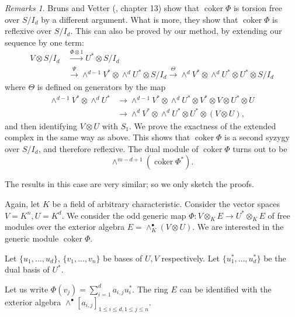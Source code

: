 \documentclass{tran-l}
\theoremstyle{plain}
\theoremstyle{remark}
\newtheorem*{remark1}{Remarks}
\theoremstyle{definition}
\newcommand{\coker}{\operatorname{coker}}
\begin{document}
\begin{remark1}
Bruns and Vetter (\cite{BV}, chapter 13) show that $\coker \Phi $ is
torsion free over $S/I_{d}$ by a different argument. 
What is more, they show that $\coker \Phi $ is
reflexive over $S/I_{d}$. 
This can also be proved by our method, by extending
our sequence by one term:
\begin{align*}
V\otimes S/I_{d} \,&{\overset{{\Phi \otimes 1}}{\longrightarrow }} U^{*}\otimes
S/I_{d} \\
&{\overset{\Psi }{\longrightarrow }}\wedge ^{d-1}V^{*}\otimes \wedge
^{d} U^{*}\otimes S/I_{d} {\overset{\Theta }{\longrightarrow }} 
\wedge ^{d}V^{*}\otimes \wedge ^{d} U^{*}\otimes U^{*}\otimes S/I_{d}
\end{align*}
where $\Theta $ is defined on generators by the map 
\begin{align*}
\wedge ^{d-1}V^{*}\otimes \wedge ^{d} U^{*}&\rightarrow \wedge 
^{d-1}V^{*}\otimes \wedge ^{d} U^{*}\otimes V^{*}\otimes V\otimes 
U^{*}\otimes U\\
&\rightarrow \wedge ^{d} V^{*}\otimes \wedge ^{d} U^{*}\otimes U^{*}\otimes
(V\otimes U) ,
\end{align*}
and then identifying $V\otimes U$ with $S_{1}$. We prove the exactness
of the extended complex in the same way as above.  This shows 
that $\coker \Phi $ is a second syzygy over $S/I_{d}$, and therefore reflexive. 
The dual module of $\coker \Phi $ turns out to be 
\[\wedge ^{m-d+1}(\coker \Phi ^{*}).\]
\end{remark1}


The results in this case are very similar; so we only sketch the proofs.

Again, let $K$ be a field  of arbitrary
characteristic. Consider the vector spaces $V=K^{n}, U=K^{d}$. We
consider the odd generic map $\Phi :V\otimes _{K} E\rightarrow U^{*}\otimes _{K} E$  of free modules over the exterior algebra $E =
\wedge ^{\bullet }_{K} (V\otimes U)$. We are interested in the generic
module $\coker \Phi $.

Let $\lbrace u_{1} ,\ldots ,u_{d}\rbrace $, $\lbrace v_{1} ,\ldots
,v_{n}\rbrace $ be bases of $U, V$ respectively. Let $\lbrace u_{1}^{*} ,\ldots
,u_{d}^{*} \rbrace $ be the dual basis of $U^{*}$.

Let us write $\Phi (v_{j} )=\sum _{i=1}^{d} a_{i,j}u_{i}^{*}$. The ring $E$
can be identified with the exterior algebra
$\wedge ^{\bullet }[a_{i,j}]_{1\le i\le d,1\le j\le n}$.
\end{document}
